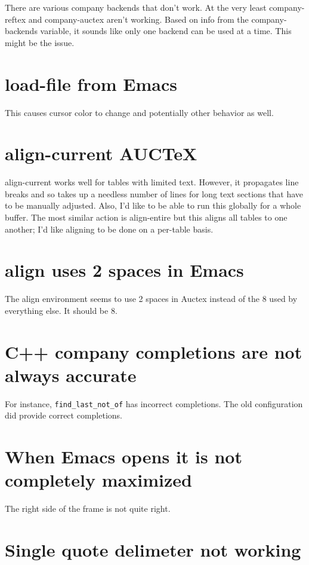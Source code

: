 \documentclass{default}
\begin{document}
There are various company backends that don't work. At the very least company-reftex and
company-auctex aren't working. Based on info from the company-backends variable, it sounds like only
one backend can be used at a time. This might be the issue.

\section{load-file from Emacs}

This causes cursor color to change and potentially other behavior as well.

\section{align-current AUCTeX}

align-current works well for tables with limited text. However, it propagates line breaks and so
takes up a needless number of lines for long text sections that have to be manually adjusted. Also,
I'd like to be able to run this globally for a whole buffer. The most similar action is align-entire
but this aligns all tables to one another; I'd like aligning to be done on a per-table basis.

\section{align uses 2 spaces in Emacs}

The align environment seems to use 2 spaces in Auctex instead of the 8 used by everything else. It
should be 8.

\section{C++ company completions are not always accurate}

For instance, \texttt{find_last_not_of} has incorrect completions. The old configuration
did provide correct completions.

\section{When Emacs opens it is not completely maximized}

The right side of the frame is not quite right.

\section{Single quote delimeter not working}
\end{document}
